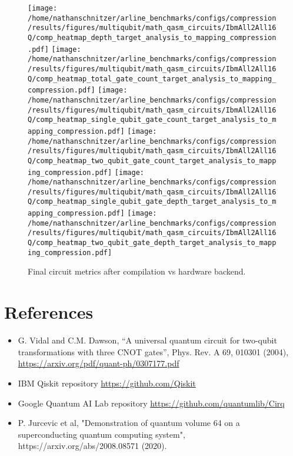 \documentclass{report}%
\begin{document}
\begin{figure}[h!]%
\centering%
\texttt{[image: /home/nathanschnitzer/arline\_benchmarks/configs/compression/results/figures/multiqubit/math\_qasm\_circuits/IbmAll2All16Q/comp\_heatmap\_depth\_target\_analysis\_to\_mapping\_compression.pdf]}%
\centering%
\texttt{[image: /home/nathanschnitzer/arline\_benchmarks/configs/compression/results/figures/multiqubit/math\_qasm\_circuits/IbmAll2All16Q/comp\_heatmap\_total\_gate\_count\_target\_analysis\_to\_mapping\_compression.pdf]}%
\linebreak%
\centering%
\texttt{[image: /home/nathanschnitzer/arline\_benchmarks/configs/compression/results/figures/multiqubit/math\_qasm\_circuits/IbmAll2All16Q/comp\_heatmap\_single\_qubit\_gate\_count\_target\_analysis\_to\_mapping\_compression.pdf]}%
\centering%
\texttt{[image: /home/nathanschnitzer/arline\_benchmarks/configs/compression/results/figures/multiqubit/math\_qasm\_circuits/IbmAll2All16Q/comp\_heatmap\_two\_qubit\_gate\_count\_target\_analysis\_to\_mapping\_compression.pdf]}%
\linebreak%
\centering%
\texttt{[image: /home/nathanschnitzer/arline\_benchmarks/configs/compression/results/figures/multiqubit/math\_qasm\_circuits/IbmAll2All16Q/comp\_heatmap\_single\_qubit\_gate\_depth\_target\_analysis\_to\_mapping\_compression.pdf]}%
\centering%
\texttt{[image: /home/nathanschnitzer/arline\_benchmarks/configs/compression/results/figures/multiqubit/math\_qasm\_circuits/IbmAll2All16Q/comp\_heatmap\_two\_qubit\_gate\_depth\_target\_analysis\_to\_mapping\_compression.pdf]}%
\linebreak%
\caption{Final circuit metrics after compilation vs hardware backend.}%
\end{figure}

%
\chapter*{References}%
\label{chap:References}%

%
\begin{itemize}%
\item%
 G. Vidal and C.M. Dawson, “A universal quantum circuit for two-qubit
                        transformations with three CNOT gates”, Phys. Rev. A 69, 010301 (2004),  %
\hyperref[]{https://arxiv.org/pdf/quant{-}ph/0307177.pdf}%
\item%
IBM Qiskit repository %
\hyperref[]{https://github.com/Qiskit}%
\item%
Google Quantum AI Lab repository %
\hyperref[]{https://github.com/quantumlib/Cirq}%
\item%
P. Jurcevic et al, "Demonstration of quantum volume 64 on a superconducting quantum
                    computing system", https://arxiv.org/abs/2008.08571 (2020).%
\end{itemize}%
\end{document}
